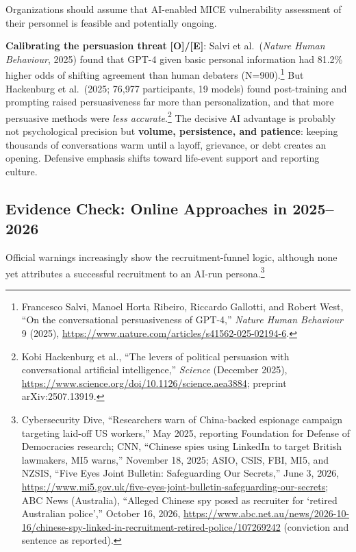 \documentclass[11pt,letterpaper]{article}
\begin{document}
\begin{warnbox}
Organizations should assume that AI-enabled MICE vulnerability assessment of their personnel is feasible and potentially ongoing.
\end{warnbox}

\textbf{Calibrating the persuasion threat} \textbf{[O]/[E]}: Salvi et al.\ (\textit{Nature Human Behaviour}, 2025) found that GPT-4 given basic personal information had 81.2\% higher odds of shifting agreement than human debaters (N=900).\footnote{Francesco Salvi, Manoel Horta Ribeiro, Riccardo Gallotti, and Robert West, ``On the conversational persuasiveness of GPT-4,'' \textit{Nature Human Behaviour} 9 (2025), \url{https://www.nature.com/articles/s41562-025-02194-6}.} But Hackenburg et al.\ (2025; 76,977 participants, 19 models) found post-training and prompting raised persuasiveness far more than personalization, and that more persuasive methods were \textit{less accurate}.\footnote{Kobi Hackenburg et al., ``The levers of political persuasion with conversational artificial intelligence,'' \textit{Science} (December 2025), \url{https://www.science.org/doi/10.1126/science.aea3884}; preprint arXiv:2507.13919.} The decisive AI advantage is probably not psychological precision but \textbf{volume, persistence, and patience}: keeping thousands of conversations warm until a layoff, grievance, or debt creates an opening. Defensive emphasis shifts toward life-event support and reporting culture.

\subsection{Evidence Check: Online Approaches in 2025--2026}

Official warnings increasingly show the recruitment-funnel logic, although none yet attributes a successful recruitment to an AI-run persona.\footnote{Cybersecurity Dive, ``Researchers warn of China-backed espionage campaign targeting laid-off US workers,'' May 2025, reporting Foundation for Defense of Democracies research; CNN, ``Chinese spies using LinkedIn to target British lawmakers, MI5 warns,'' November 18, 2025; ASIO, CSIS, FBI, MI5, and NZSIS, ``Five Eyes Joint Bulletin: Safeguarding Our Secrets,'' June 3, 2026, \url{https://www.mi5.gov.uk/five-eyes-joint-bulletin-safeguarding-our-secrets}; ABC News (Australia), ``Alleged Chinese spy posed as recruiter for `retired Australian police','' October 16, 2026, \url{https://www.abc.net.au/news/2026-10-16/chinese-spy-linked-in-recruitment-retired-police/107269242} (conviction and sentence as reported).}
\end{document}
